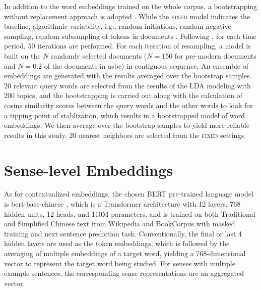 In addition to the word embeddings trained on the whole corpus, a bootstrapping without replacement approach is adopted \parencite{antoniak2018evaluating}. While the \textsc{fixed} model indicates the baseline, algorithmic variability, i.g., random initiations, random negative sampling, random subsampling of tokens in documents \parencite{antoniak2018evaluating}. Following \textcite{antoniak2018evaluating}, for each time period, 50 iterations are performed. For each iteration of resampling, a model is built on the $N$ randomly selected documents ($N=150$ for pre-modern documents and $N=0.2$ of the documents in \gls{asbc}) in contiguous sequence. An ensemble of embeddings are generated with the results averaged over the bootstrap samples. 20 relevant query words are selected from the results of the LDA modeling with 200 topics, and the bootstrapping is carried out along with the calculation of cosine similarity scores between the query words and the other words to look for a tipping point of stablization, which results in a bootstrapped model of word embeddings. We then average over the bootstrap samples to yield more reliable results in this study. 20 nearest neighbors are selected from the \textsc{fixed} settings. 


\section{Sense-level Embeddings}
As for contextualized embeddings, the chosen BERT pre-trained language model is bert-base-chinese \parencite{devlin2018bert}, which is a Transformer architecture with 12 layers, 768 hidden units, 12 heads, and 110M parameters, and is trained on both Traditional and Simplified Chinese text from Wikipedia and BookCorpus with masked training and next sentence prediction task. Conventionally, the final or last 4 hidden layers are used as the token embeddings, which is followed by the averaging of multiple embeddings of a target word, yielding a 768-dimensional vector to represent the target word being studied. For senses with multiple example sentences, the corresponding sense representations are an aggregated vector.

